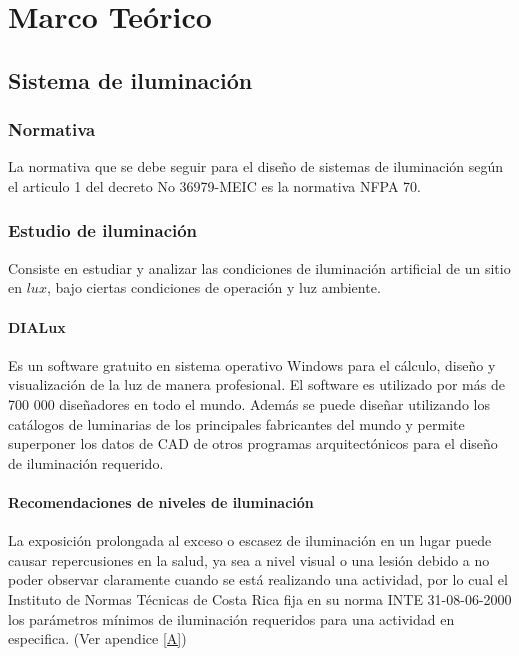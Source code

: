   \chapter{Marco Teórico} 
\label{C:antecedentes}


\section{Sistema de iluminación}

\subsection{Normativa}

La normativa que se debe seguir para el diseño de sistemas de iluminación según el articulo 1 del decreto No 36979-MEIC es la normativa NFPA 70. \cite{CIEMI}




\subsection{Estudio de iluminación}

Consiste en estudiar y analizar las condiciones de iluminación artificial de un sitio en $lux$, bajo ciertas condiciones de operación y luz ambiente.

\subsubsection{DIALux}


Es un software gratuito en sistema operativo Windows para el cálculo, diseño y visualización de la luz de manera profesional. El software es utilizado por más de 700 000 diseñadores en todo el mundo. Además se puede diseñar utilizando los catálogos de luminarias de los principales fabricantes del mundo y permite superponer los datos de CAD de otros programas arquitectónicos para el diseño de iluminación requerido. \cite{DIALux}


\subsubsection{Recomendaciones de niveles de iluminación}

La exposición prolongada al exceso o escasez de iluminación en un lugar puede causar repercusiones en la salud, ya sea a nivel visual o una lesión debido a no poder observar claramente cuando se está realizando una actividad, por lo cual el Instituto de Normas Técnicas de Costa Rica fija en su norma INTE 31-08-06-2000 los parámetros mínimos de iluminación requeridos para una actividad en especifica. (Ver apendice \ref{A}) \cite{Inteco}\\
 



